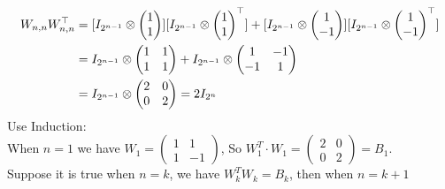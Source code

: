 \documentclass[12pt]{article}
\begin{document}
\begin{align*}
W_{n, n} \transpos{W_{n, n}} &= 
[I_{2^{n-1}} \tensor 
\begin{pmatrix}
1 \\
1
\end{pmatrix}]
[I_{2^{n-1}} \tensor 
\transpos{\begin{pmatrix}
1 \\
1
\end{pmatrix}
}] + 
[I_{2^{n-1}} \tensor 
\begin{pmatrix}
1 \\
-1
\end{pmatrix}]
[I_{2^{n-1}} \tensor 
\transpos{
\begin{pmatrix}
1 \\
-1
\end{pmatrix}}] \\
&=
I_{2^{n-1}} \tensor 
\begin{pmatrix}
1 &1 \\
1 &1 
\end{pmatrix} +
I_{2^{n-1}} \tensor 
\begin{pmatrix}
1 &-1 \\
-1 &1 
\end{pmatrix} \\
&= 
I_{2^{n-1}} \tensor 
\begin{pmatrix}
2 &0 \\
0 &2 
\end{pmatrix} = 
2I_{2^n} 
\end{align*}
Use Induction: \\
When $n = 1$ we have $W_1 = 
\begin{pmatrix}
1 &1 \\
1 &-1
\end{pmatrix}$, So $
W_1^T \cdot W_1 = 
\begin{pmatrix}
2 &0 \\
0 &2
\end{pmatrix} = B_1
$. \\
Suppose it is true when $n = k$, we have $W_k^T W_k = B_k$, then when $n = k + 1$ 
\end{document}
